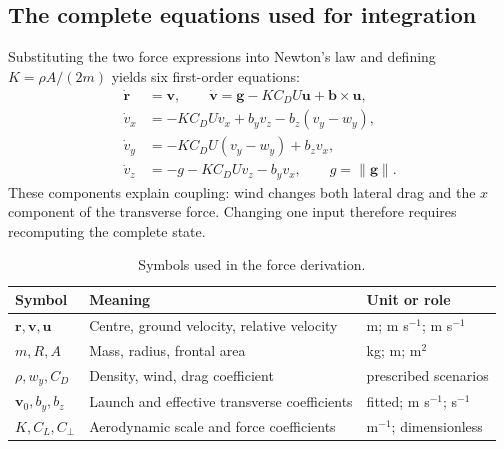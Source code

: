 \documentclass[11pt,a4paper]{article}
\begin{document}
\subsection{The complete equations used for integration}
Substituting the two force expressions into Newton's law and defining $K=\rho A/(2m)$ yields six first-order equations:
\begin{align}
\dot{\mathbf r}&=\mathbf v,\qquad\dot{\mathbf v}=\mathbf g-KC_DU\mathbf u+\mathbf b\times\mathbf u,\label{eq:model}\\
\dot v_x&=-KC_DUv_x+b_yv_z-b_z(v_y-w_y),\nonumber\\
\dot v_y&=-KC_DU(v_y-w_y)+b_zv_x,\nonumber\\
\dot v_z&=-g-KC_DUv_z-b_yv_x,\qquad g=\|\mathbf g\|.\nonumber
\end{align}
These components explain coupling: wind changes both lateral drag and the $x$ component of the transverse force. Changing one input therefore requires recomputing the complete state.
\begin{table}[H]\centering\small
\caption{Symbols used in the force derivation.}\begin{tabular}{lll}\toprule
Symbol & Meaning & Unit or role\\\midrule
$\mathbf r,\mathbf v,\mathbf u$ & Centre, ground velocity, relative velocity & m; m s$^{-1}$; m s$^{-1}$\\
$m,R,A$ & Mass, radius, frontal area & kg; m; m$^2$\\
$\rho,w_y,C_D$ & Density, wind, drag coefficient & prescribed scenarios\\
$\mathbf v_0,b_y,b_z$ & Launch and effective transverse coefficients & fitted; m s$^{-1}$; s$^{-1}$\\
$K,C_L,C_\perp$ & Aerodynamic scale and force coefficients & m$^{-1}$; dimensionless\\
\bottomrule\end{tabular}\end{table}
\end{document}
